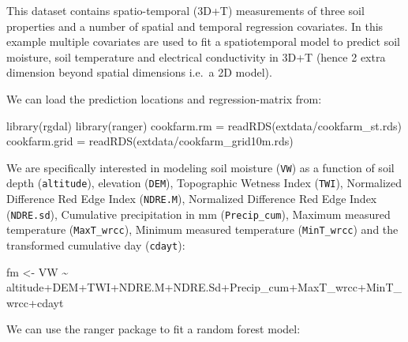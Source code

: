 \documentclass[
  graybox,natbib,nospthms]{svmono}
\newenvironment{Shaded}{\begin{snugshade}}{\end{snugshade}}
\newcommand{\FunctionTok}[1]{\textcolor[rgb]{0,0,0}{#1}}
\newcommand{\NormalTok}[1]{#1}
\newcommand{\OtherTok}[1]{\textcolor[rgb]{0.37,0.37,0.37}{#1}}
\newcommand{\SpecialCharTok}[1]{\textcolor[rgb]{0,0,0}{#1}}
\newcommand{\StringTok}[1]{\textcolor[rgb]{0.5,0.5,0.5}{#1}}
\begin{document}
This dataset contains spatio-temporal (3D+T) measurements of three soil
properties and a number of spatial and temporal regression covariates.
In this example multiple covariates are used to fit a spatiotemporal model to
predict soil moisture, soil temperature and electrical conductivity in 3D+T
(hence 2 extra dimension beyond spatial dimensions i.e.~a 2D model).

We can load the prediction locations and regression-matrix from:

\begin{Shaded}
\begin{Highlighting}[]
\FunctionTok{library}\NormalTok{(rgdal)}
\FunctionTok{library}\NormalTok{(ranger)}
\NormalTok{cookfarm.rm }\OtherTok{=} \FunctionTok{readRDS}\NormalTok{(}\StringTok{\textquotesingle{}extdata/cookfarm\_st.rds\textquotesingle{}}\NormalTok{)}
\NormalTok{cookfarm.grid }\OtherTok{=} \FunctionTok{readRDS}\NormalTok{(}\StringTok{\textquotesingle{}extdata/cookfarm\_grid10m.rds\textquotesingle{}}\NormalTok{)}
\end{Highlighting}
\end{Shaded}

We are specifically interested in modeling soil moisture (\texttt{VW}) as a function of soil
depth (\texttt{altitude}), elevation (\texttt{DEM}), Topographic Wetness Index
(\texttt{TWI}), Normalized Difference Red Edge Index (\texttt{NDRE.M}), Normalized
Difference Red Edge Index (\texttt{NDRE.sd}), Cumulative precipitation in mm
(\texttt{Precip\_cum}), Maximum measured temperature (\texttt{MaxT\_wrcc}), Minimum
measured temperature (\texttt{MinT\_wrcc}) and the transformed cumulative day
(\texttt{cdayt}):

\begin{Shaded}
\begin{Highlighting}[]
\NormalTok{fm }\OtherTok{\textless{}{-}}\NormalTok{ VW }\SpecialCharTok{\textasciitilde{}}\NormalTok{ altitude}\SpecialCharTok{+}\NormalTok{DEM}\SpecialCharTok{+}\NormalTok{TWI}\SpecialCharTok{+}\NormalTok{NDRE.M}\SpecialCharTok{+}\NormalTok{NDRE.Sd}\SpecialCharTok{+}\NormalTok{Precip\_cum}\SpecialCharTok{+}\NormalTok{MaxT\_wrcc}\SpecialCharTok{+}\NormalTok{MinT\_wrcc}\SpecialCharTok{+}\NormalTok{cdayt}
\end{Highlighting}
\end{Shaded}

We can use the ranger package to fit a random forest model:
\end{document}
